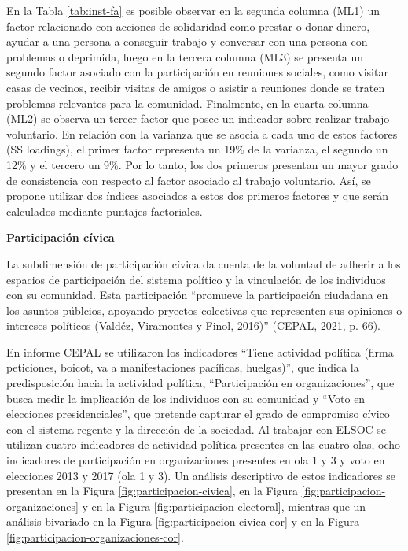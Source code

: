 \documentclass[
  12pt,
]{book}
\begin{document}
En la Tabla \ref{tab:inst-fa} es posible observar en la segunda columna (ML1) un factor relacionado con acciones de solidaridad como prestar o donar dinero, ayudar a una persona a conseguir trabajo y conversar con una persona con problemas o deprimida, luego en la tercera columna (ML3) se presenta un segundo factor asociado con la participación en reuniones sociales, como visitar casas de vecinos, recibir visitas de amigos o asistir a reuniones donde se traten problemas relevantes para la comunidad. Finalmente, en la cuarta columna (ML2) se observa un tercer factor que posee un indicador sobre realizar trabajo voluntario. En relación con la varianza que se asocia a cada uno de estos factores (SS loadings), el primer factor representa un 19\% de la varianza, el segundo un 12\% y el tercero un 9\%. Por lo tanto, los dos primeros presentan un mayor grado de consistencia con respecto al factor asociado al trabajo voluntario. Así, se propone utilizar dos índices asociados a estos dos primeros factores y que serán calculados mediante puntajes factoriales.

\textbf{Participación cívica}

La subdimensión de participación cívica da cuenta de la voluntad de adherir a los espacios de participación del sistema político y la vinculación de los individuos con su comunidad. Esta participación ``promueve la participación ciudadana en los asuntos públcios, apoyando pryectos colectivas que representen sus opiniones o intereses políticos (Valdéz, Viramontes y Finol, 2016)'' (\protect\hyperlink{ref-cepal_Cohesion_2021}{CEPAL, 2021, p. 66}).

En informe CEPAL se utilizaron los indicadores ``Tiene actividad política (firma peticiones, boicot, va a manifestaciones pacíficas, huelgas)'', que indica la predisposición hacia la actividad política, ``Participación en organizaciones'', que busca medir la implicación de los individuos con su comunidad y ``Voto en elecciones presidenciales'', que pretende capturar el grado de compromiso cívico con el sistema regente y la dirección de la sociedad. Al trabajar con ELSOC se utilizan cuatro indicadores de actividad política presentes en las cuatro olas, ocho indicadores de participación en organizaciones presentes en ola 1 y 3 y voto en elecciones 2013 y 2017 (ola 1 y 3). Un análisis descriptivo de estos indicadores se presentan en la Figura \ref{fig:participacion-civica}, en la Figura \ref{fig:participacion-organizaciones} y en la Figura \ref{fig:participacion-electoral}, mientras que un análisis bivariado en la Figura \ref{fig:participacion-civica-cor} y en la Figura \ref{fig:participacion-organizaciones-cor}.
\end{document}
